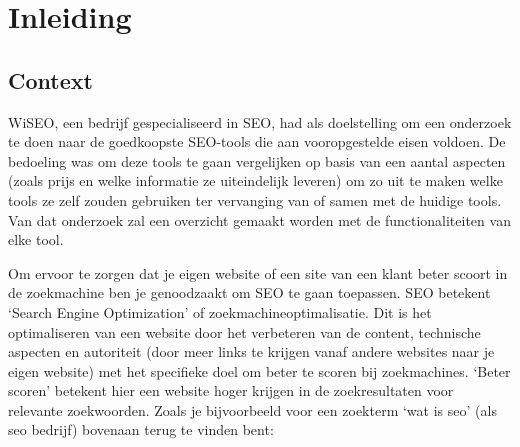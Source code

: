 \chapter{Inleiding}
\label{ch:inleiding}

\section{Context}
\label{sec:context}

WiSEO, een bedrijf gespecialiseerd in SEO, had als doelstelling om een onderzoek te doen naar de goedkoopste SEO-tools die aan vooropgestelde eisen voldoen. De bedoeling was om deze tools te gaan vergelijken op basis van een aantal aspecten (zoals prijs en welke informatie ze uiteindelijk leveren) om zo uit te maken welke tools ze zelf zouden gebruiken ter vervanging van of samen met de huidige tools. Van dat onderzoek zal een overzicht gemaakt worden met de functionaliteiten van elke tool. 

Om ervoor te zorgen dat je eigen website of een site van een klant beter scoort in de zoekmachine ben je genoodzaakt om SEO te gaan toepassen. SEO betekent ‘Search Engine Optimization’ of zoekmachineoptimalisatie. Dit is het optimaliseren van een website door het verbeteren van de content, technische aspecten en autoriteit (door meer links te krijgen vanaf andere websites naar je eigen website) met het specifieke doel om beter te scoren bij zoekmachines. ‘Beter scoren’ betekent hier een website hoger krijgen in de zoekresultaten voor relevante zoekwoorden. Zoals je bijvoorbeeld voor een zoekterm ‘wat is seo’ (als seo bedrijf) bovenaan terug te vinden bent: 

